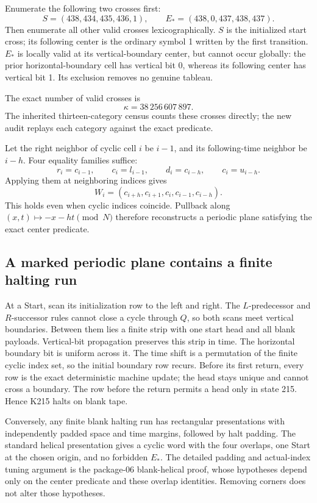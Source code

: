 \documentclass[11pt,a4paper]{article}
\theoremstyle{definition}\newtheorem{definition}[theorem]{Definition}
\theoremstyle{remark}\newtheorem{remark}[theorem]{Remark}
\begin{document}
Enumerate the following two crosses first:
\[
 S=(438,434,435,436,1),\qquad
 E_*=(438,0,437,438,437).
\]
Then enumerate all other valid crosses lexicographically. \(S\) is
the initialized start cross; its following center is the ordinary
symbol 1 written by the first transition. \(E_*\) is locally valid
at its vertical-boundary center, but cannot occur globally: the prior
horizontal-boundary cell has vertical bit 0, whereas its following
center has vertical bit 1. Its exclusion removes no genuine tableau.

The exact number of valid crosses is
\begin{equation}\label{eq:cross-count}
 \kappa=38\,256\,607\,897.
\end{equation}
The inherited thirteen-category census counts these crosses directly;
the new audit replays each category against the exact predicate.

Let the right neighbor of cyclic cell \(i\) be \(i-1\), and its
following-time neighbor be \(i-h\). Four equality families suffice:
\[
 r_i=c_{i-1},\qquad c_i=l_{i-1},\qquad
 d_i=c_{i-h},\qquad c_i=u_{i-h}.
\]
Applying them at neighboring indices gives
\begin{equation}\label{eq:reconstruct}
 W_i=(c_{i+h},c_{i+1},c_i,c_{i-1},c_{i-h}).
\end{equation}
This holds even when cyclic indices coincide. Pullback along
\((x,t)\mapsto-x-ht\pmod N\) therefore reconstructs a periodic
plane satisfying the exact center predicate.

\subsection{A marked periodic plane contains a finite halting run}

At a Start, scan its initialization row to the left and right. The
\(L\)-predecessor and \(R\)-successor rules cannot close a cycle
through \(Q\), so both scans meet vertical boundaries. Between them
lies a finite strip with one start head and all blank payloads.
Vertical-bit propagation preserves this strip in time. The horizontal
boundary bit is uniform across it. The time shift is a permutation of
the finite cyclic index set, so the initial boundary row recurs. Before
its first return, every row is the exact deterministic machine update;
the head stays unique and cannot cross a boundary. The row before the
return permits a head only in state 215. Hence K215 halts on blank tape.

Conversely, any finite blank halting run has rectangular presentations
with independently padded space and time margins, followed by halt
padding. The standard helical presentation gives a cyclic word with
the four overlaps, one Start at the chosen origin, and no forbidden
\(E_*\). The detailed padding and actual-index tuning argument is
the package-06 blank-helical proof, whose hypotheses depend only on
the center predicate and these overlap identities. Removing corners
does not alter those hypotheses.
\end{document}
